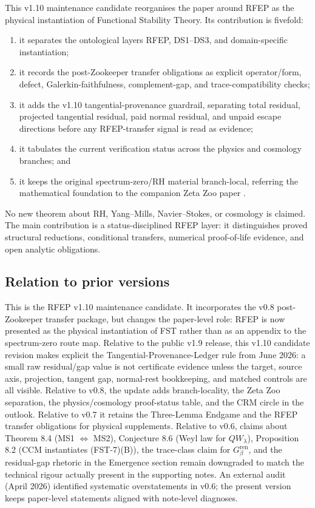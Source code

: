 \documentclass[11pt,a4paper]{article}
\theoremstyle{plain}
\theoremstyle{definition}
\begin{document}
This v1.10 maintenance candidate reorganises the paper around RFEP as the physical
instantiation of Functional Stability Theory.  Its contribution is
fivefold:
\begin{enumerate}[leftmargin=*]
  \item it separates the ontological layers RFEP, DS1--DS3, and
    domain-specific instantiation;
  \item it records the post-Zookeeper transfer obligations as
    explicit operator/form, defect, Galerkin-faithfulness,
    complement-gap, and trace-compatibility checks;
  \item it adds the v1.10 tangential-provenance guardrail, separating
    total residual, projected tangential residual, paid normal
    residual, and unpaid escape directions before any RFEP-transfer
    signal is read as evidence;
  \item it tabulates the current verification status across the
    physics and cosmology branches; and
  \item it keeps the original spectrum-zero/RH material branch-local,
    referring the mathematical foundation to the companion Zeta Zoo
    paper \cite{ZetaZooMaster}.
\end{enumerate}

No new theorem about RH, Yang--Mills, Navier--Stokes, or cosmology is
claimed.  The main contribution is a status-disciplined RFEP layer: it
distinguishes proved structural reductions, conditional transfers,
numerical proof-of-life evidence, and open analytic obligations.

\subsection{Relation to prior versions}

This is the RFEP v1.10 maintenance candidate.  It incorporates the v0.8
post-Zookeeper transfer package, but changes the paper-level role:
RFEP is now presented as the physical instantiation of FST rather
than as an appendix to the spectrum-zero route map.  Relative to
the public v1.9 release, this v1.10 candidate revision makes explicit
the Tangential-Provenance-Ledger rule from June 2026: a small raw
residual/gap value is not certificate evidence unless the target,
source axis, projection, tangent gap, normal-rest bookkeeping, and
matched controls are all visible.  Relative to
v0.8, the update adds branch-locality, the Zeta Zoo separation, the
physics/cosmology proof-status table, and the CRM circle in the
outlook.  Relative to v0.7 it retains the Three-Lemma Endgame and the
RFEP transfer obligations for physical supplements.  Relative to
v0.6, claims about Theorem 8.4 (MS1 $\Leftrightarrow$ MS2),
Conjecture 8.6 (Weyl law for $QW_\lambda$), Proposition 8.2 (CCM
instantiates (FST-7)(B)), the trace-class claim for
$G_\beta^{\mathrm{ren}}$, and the residual-gap rhetoric in the
Emergence section remain downgraded to match the technical rigour
actually present in the supporting notes.  An external audit (April
2026) identified systematic overstatements in v0.6; the present
version keeps paper-level statements aligned with note-level
diagnoses.
\end{document}
